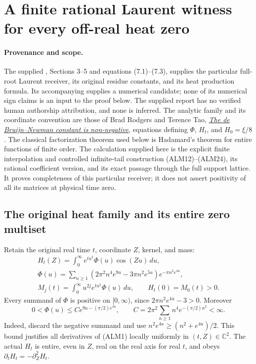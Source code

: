 \section{A finite rational Laurent witness for every off-real heat zero}
\label{sec:all-root-laurent-moment-receiver}

\paragraph{Provenance and scope.}
The supplied ,
Sections 3--5 and equations (7.1)--(7.3), supplies the particular
full-root Laurent receiver, its original residue constants, and its
heat production formula. Its accompanying 
supplies a numerical candidate; none of its numerical sign claims is
an input to the proof below. The supplied report has no verified human
authorship attribution, and none is inferred. The analytic family and
its coordinate convention are those of Brad Rodgers and Terence Tao,
\href{https://arxiv.org/abs/1801.05914v5}{\emph{The de Bruijn--Newman
constant is non-negative}}, equations defining $\Phi$, $H_t$, and
$H_0=\xi/8$. The classical factorization theorem used below is
Hadamard's theorem for entire functions of finite order. The
calculation supplied here is the explicit finite interpolation and controlled
infinite-tail construction (ALM12)--(ALM24), its rational coefficient
version, and its exact passage through the full support lattice.
It proves completeness of this particular receiver; it does not assert
positivity of all its matrices at physical time zero.

\subsection{The original heat family and its entire zero multiset}

Retain the original real time $t$, coordinate $Z$, kernel, and mass:
\begin{equation}\tag{ALM1}
\begin{gathered}
 H_t(Z)=\int_0^\infty e^{tu^2}\Phi(u)\cos(Zu)\,du,\\
 \Phi(u)=\sum_{n\ge1}
 (2\pi^2n^4e^{9u}-3\pi n^2e^{5u})e^{-\pi n^2e^{4u}},\\
 M_j(t)=\int_0^\infty u^{2j}e^{tu^2}\Phi(u)\,du,
 \qquad H_t(0)=M_0(t)>0.
\end{gathered}
\end{equation}
Every summand of $\Phi$ is positive on $[0,\infty)$, since
$2\pi n^2e^{4u}-3>0$. Moreover
\begin{equation}\tag{ALM2}
 0<\Phi(u)\le C e^{9u-(\pi/2)e^{4u}},\qquad
 C=2\pi^2\sum_{n\ge1}n^4e^{-(\pi/2)n^2}<\infty.
\end{equation}
Indeed, discard the negative summand and use
$n^2e^{4u}\ge(n^2+e^{4u})/2$. This bound justifies all derivatives of
(ALM1) locally uniformly in $(t,Z)\in\mathbb C^2$. The actual $H_t$
is entire, even in $Z$, real on the real axis for real $t$, and obeys
$\partial_t H_t=-\partial_Z^2H_t$.

